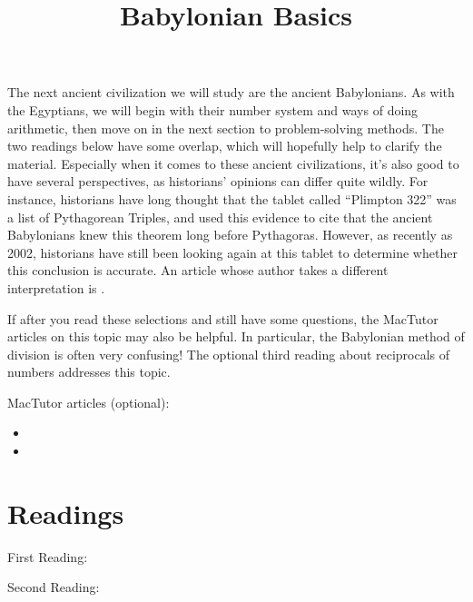 \documentclass{ximera}
\title{Babylonian Basics}
\begin{document}
\begin{abstract}
\end{abstract}
\maketitle

The next ancient civilization we will study are the ancient Babylonians.  As with the Egyptians, we will begin with their number system and ways of doing arithmetic, then move on in the next section to problem-solving methods.  The two readings below have some overlap, which will hopefully help to clarify the material.  Especially when it comes to these ancient civilizations, it's also good to have several perspectives, as historians' opinions can differ quite wildly.  For instance, historians have long thought that the tablet called ``Plimpton 322'' was a list of Pythagorean Triples, and used this evidence to cite that the ancient Babylonians knew this theorem long before Pythagoras.  However, as recently as 2002, historians have still been looking again at this tablet to determine whether this conclusion is accurate.  An article whose author takes a different interpretation is .

If after you read these selections and still have some questions, the MacTutor articles on this topic may also be helpful.  In particular, the Babylonian method of division is often very confusing!  The optional third reading about reciprocals of numbers addresses this topic.

MacTutor articles (optional):
\begin{itemize}
\item {}
\item {}
\end{itemize}




\section{Readings}

First Reading:  

Second Reading: 
\end{document}
